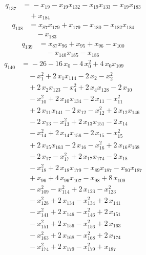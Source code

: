 \documentclass[11pt]{article}
\theoremstyle{remark}\newtheorem{remark}[theorem]{Remark}
\begin{document}
\begin{align*}
q_{137} &={}-x_{19} -x_{19}x_{132} -x_{19}x_{133} -x_{19}x_{183}\\
&\quad +x_{184}
\end{align*}
\begin{align*}
q_{138} &={}x_{87}x_{179} +x_{179} -x_{180} -x_{182}x_{184}\\
&\quad -x_{183}
\end{align*}
\begin{align*}
q_{139} &={}x_{87}x_{96} +x_{95} +x_{96} -x_{100}\\
&\quad -x_{140}x_{185} -x_{186}
\end{align*}
\begin{align*}
q_{140} &={}-26 -16\,x_{0} -4\,x_{0}^{2} +4\,x_{0}x_{109}\\
&\quad -x_{1}^{2} +2\,x_{1}x_{114} -2\,x_{2} -x_{2}^{2}\\
&\quad +2\,x_{2}x_{123} -x_{4}^{2} +2\,x_{4}x_{128} -2\,x_{10}\\
&\quad -x_{10}^{2} +2\,x_{10}x_{134} -2\,x_{11} -x_{11}^{2}\\
&\quad +2\,x_{11}x_{141} -2\,x_{12} -x_{12}^{2} +2\,x_{12}x_{146}\\
&\quad -2\,x_{13} -x_{13}^{2} +2\,x_{13}x_{151} -2\,x_{14}\\
&\quad -x_{14}^{2} +2\,x_{14}x_{156} -2\,x_{15} -x_{15}^{2}\\
&\quad +2\,x_{15}x_{163} -2\,x_{16} -x_{16}^{2} +2\,x_{16}x_{168}\\
&\quad -2\,x_{17} -x_{17}^{2} +2\,x_{17}x_{174} -2\,x_{18}\\
&\quad -x_{18}^{2} +2\,x_{18}x_{179} -x_{89}x_{187} -x_{90}x_{187}\\
&\quad +x_{96} +4\,x_{96}x_{107} -x_{98} +8\,x_{109}\\
&\quad -x_{109}^{2} -x_{114}^{2} +2\,x_{123} -x_{123}^{2}\\
&\quad -x_{128}^{2} +2\,x_{134} -x_{134}^{2} +2\,x_{141}\\
&\quad -x_{141}^{2} +2\,x_{146} -x_{146}^{2} +2\,x_{151}\\
&\quad -x_{151}^{2} +2\,x_{156} -x_{156}^{2} +2\,x_{163}\\
&\quad -x_{163}^{2} +2\,x_{168} -x_{168}^{2} +2\,x_{174}\\
&\quad -x_{174}^{2} +2\,x_{179} -x_{179}^{2} +x_{187}
\end{align*}
\end{document}
